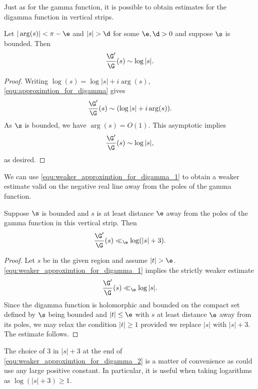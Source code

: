 \documentclass[12pt]{article}
\begin{document}
    Just as for the gamma function, it is possible to obtain estimates for the digamma function in vertical strips.

    \begin{corollary}\label{equ:weaker_approximtion_for_digamma_1}
      Let \(|\arg(s)| < \pi-\e\) and \(|s| > \d\) for some \(\e,\d > 0\) and suppose \(\s\) is bounded. Then
      \[
        \frac{\G'}{\G}(s) \sim \log|s|.
      \]
    \end{corollary}
    \begin{proof}
      Writing \(\log(s) = \log|s|+i\arg(s)\), \cref{equ:approximtion_for_digamma} gives
      \[
        \frac{\G'}{\G}(s) \sim (\log|s|+i\arg(s)).
      \]
      As \(\s\) is bounded, we have \(\arg(s) = O(1)\). This asymptotic implies
      \[
        \frac{\G'}{\G}(s) \sim \log|s|,
      \]
      as desired.
    \end{proof}

    We can use \cref{equ:weaker_approximtion_for_digamma_1} to obtain a weaker estimate valid on the negative real line away from the poles of the gamma function.

    \begin{corollary}\label{equ:weaker_approximtion_for_digamma_2}
      Suppose \(\s\) is bounded and \(s\) is at least distance \(\e\) away from the poles of the gamma function in this vertical strip. Then
      \[
        \frac{\G'}{\G}(s) \ll_{\e} \log(|s|+3).
      \]
    \end{corollary}
    \begin{proof}
      Let \(s\) be in the given region and assume \(|t| > \e\). \cref{equ:weaker_approximtion_for_digamma_1} implies the strictly weaker estimate
      \[
        \frac{\G'}{\G}(s) \ll_{\e} \log|s|.
      \]
      Since the digamma function is holomorphic and bounded on the compact set defined by \(\s\) being bounded and \(|t| \le \e\) with \(s\) at least distance \(\e\) away from its poles, we may relax the condition \(|t| \ge 1\) provided we replace \(|s|\) with \(|s|+3\). The estimate follows.
    \end{proof}

    The choice of \(3\) in \(|s|+3\) at the end of \cref{equ:weaker_approximtion_for_digamma_2} is a matter of convenience as could use any large positive constant. In particular, it is useful when taking logarithms as \(\log(|s|+3) \ge 1\).
\end{document}
